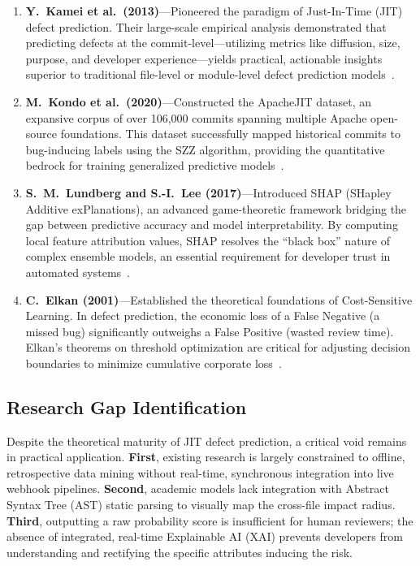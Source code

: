 \documentclass[12pt, a4paper]{article}
\begin{document}
\begin{enumerate}
    \item \textbf{Y.\ Kamei et al.\ (2013)}---Pioneered the paradigm of Just-In-Time (JIT) defect prediction. Their large-scale empirical analysis demonstrated that predicting defects at the commit-level---utilizing metrics like diffusion, size, purpose, and developer experience---yields practical, actionable insights superior to traditional file-level or module-level defect prediction models~\cite{kamei2013}.
    
    \item \textbf{M.\ Kondo et al.\ (2020)}---Constructed the ApacheJIT dataset, an expansive corpus of over 106,000 commits spanning multiple Apache open-source foundations. This dataset successfully mapped historical commits to bug-inducing labels using the SZZ algorithm, providing the quantitative bedrock for training generalized predictive models~\cite{kondo2020}.
    
    \item \textbf{S.\ M.\ Lundberg and S.-I.\ Lee (2017)}---Introduced SHAP (SHapley Additive exPlanations), an advanced game-theoretic framework bridging the gap between predictive accuracy and model interpretability. By computing local feature attribution values, SHAP resolves the ``black box'' nature of complex ensemble models, an essential requirement for developer trust in automated systems~\cite{lundberg2017}.
    
    \item \textbf{C.\ Elkan (2001)}---Established the theoretical foundations of Cost-Sensitive Learning. In defect prediction, the economic loss of a False Negative (a missed bug) significantly outweighs a False Positive (wasted review time). Elkan's theorems on threshold optimization are critical for adjusting decision boundaries to minimize cumulative corporate loss~\cite{elkan2001}.
\end{enumerate}

\subsection{Research Gap Identification}
Despite the theoretical maturity of JIT defect prediction, a critical void remains in practical application. \textbf{First}, existing research is largely constrained to offline, retrospective data mining without real-time, synchronous integration into live webhook pipelines. \textbf{Second}, academic models lack integration with Abstract Syntax Tree (AST) static parsing to visually map the cross-file impact radius. \textbf{Third}, outputting a raw probability score is insufficient for human reviewers; the absence of integrated, real-time Explainable AI (XAI) prevents developers from understanding and rectifying the specific attributes inducing the risk.
\end{document}
